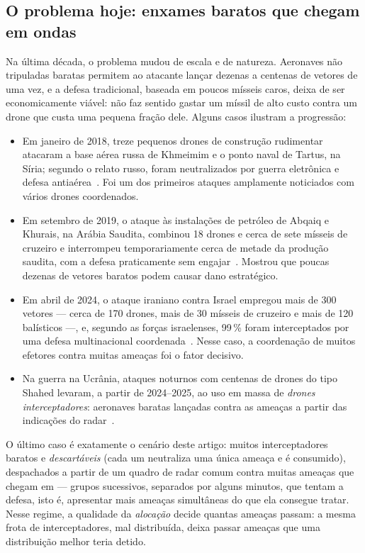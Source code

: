 \subsection{O problema hoje: enxames baratos que chegam em ondas}
Na última década, o problema mudou de escala e de natureza. Aeronaves não tripuladas baratas permitem ao atacante
lançar dezenas a centenas de vetores de uma vez, e a defesa tradicional, baseada em poucos mísseis caros, deixa de ser
economicamente viável: não faz sentido gastar um míssil de alto custo contra um drone que custa uma pequena fração dele.
Alguns casos ilustram a progressão:
\begin{itemize}
  \item Em janeiro de 2018, treze pequenos drones de construção rudimentar atacaram a base aérea russa de Khmeimim e o
        ponto naval de Tartus, na Síria; segundo o relato russo, foram neutralizados por guerra eletrônica e defesa
        antiaérea~\cite{bellingcat2018}. Foi um dos primeiros ataques amplamente noticiados com vários drones
        coordenados.
  \item Em setembro de 2019, o ataque às instalações de petróleo de Abqaiq e Khurais, na Arábia Saudita, combinou 18
        drones e cerca de sete mísseis de cruzeiro e interrompeu temporariamente cerca de metade da produção saudita, com
        a defesa praticamente sem engajar~\cite{idsa2019}. Mostrou que poucas dezenas de vetores baratos podem causar dano
        estratégico.
  \item Em abril de 2024, o ataque iraniano contra Israel empregou mais de 300 vetores --- cerca de 170 drones, mais de
        30 mísseis de cruzeiro e mais de 120 balísticos ---, e, segundo as forças israelenses, 99\,\% foram interceptados por
        uma defesa multinacional coordenada~\cite{pbs2024}. Nesse caso, a coordenação de muitos efetores contra muitas
        ameaças foi o fator decisivo.
  \item Na guerra na Ucrânia, ataques noturnos com centenas de drones do tipo Shahed levaram, a partir de 2024--2025, ao
        uso em massa de \emph{drones interceptadores}: aeronaves baratas lançadas contra as ameaças a partir das
        indicações do radar~\cite{pravda2025}.
\end{itemize}
O último caso é exatamente o cenário deste artigo: muitos interceptadores baratos e \emph{descartáveis} (cada um
neutraliza uma única ameaça e é consumido), despachados a partir de um quadro de radar comum contra muitas ameaças que
chegam em  --- grupos sucessivos, separados por alguns minutos, que tentam  a defesa,
isto é, apresentar mais ameaças simultâneas do que ela consegue tratar. Nesse regime, a qualidade da \emph{alocação}
decide quantas ameaças passam: a mesma frota de interceptadores, mal distribuída, deixa passar ameaças que uma
distribuição melhor teria detido.

